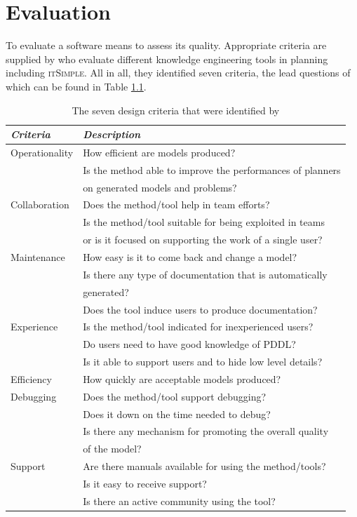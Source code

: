 \documentclass[a4paper,12pt]{report}
\newcommand{\itsimple}{\textsc{itSimple}\xspace}
\begin{document}
\chapter{Evaluation}
\label{sec-5}
\label{ch:evaluation}

To evaluate a software means to assess its quality. Appropriate
criteria are supplied by \textcite{shah2013knowledge} who evaluate
different knowledge engineering tools in planning including \itsimple.
All in all, they identified seven criteria, the lead questions of
which can be found in Table \ref{tab:criteria}.

\begin{table}[htb]
\centering
\begin{tabular}{ll}
\emph{Criteria} & \emph{Description}\\
\hline
Operationality & How efficient are models produced?\\
 & Is the method able to improve the performances of planners\\
 & on generated models and problems?\\
Collaboration & Does the method/tool help in team efforts?\\
 & Is the method/tool suitable for being exploited in teams\\
 & or is it focused on supporting the work of a single user?\\
Maintenance & How easy is it to come back and change a model?\\
 & Is there any type of documentation that is automatically\\
 & generated?\\
 & Does the tool induce users to produce documentation?\\
Experience & Is the method/tool indicated for inexperienced users?\\
 & Do users need to have good knowledge of PDDL?\\
 & Is it able to support users and to hide low level details?\\
Efficiency & How quickly are acceptable models produced?\\
Debugging & Does the method/tool support debugging?\\
 & Does it down on the time needed to debug?\\
 & Is there any mechanism for promoting the overall quality\\
 & of the model?\\
Support & Are there manuals available for using the method/tools?\\
 & Is it easy to receive support?\\
 & Is there an active community using the tool?\\
\end{tabular}\caption{\label{tab:criteria}The seven design criteria that were identified by \textcite{shah2013knowledge}}

\end{table}
\end{document}

